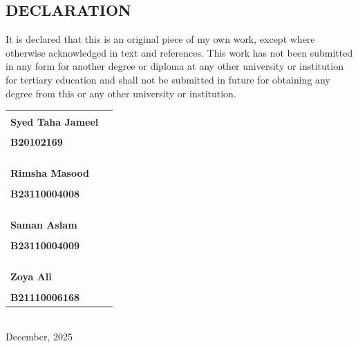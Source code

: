 \providecommand\phantomsection{} \phantomsection
\thispagestyle{plain}
\renewcommand{\baselinestretch}{1}\small\normalsize
\begin{center}
\section*{\centering\MakeUppercase{Declaration}}
\end{center}
\justify
It is declared that this is an original piece of my own work, except where otherwise acknowledged in text and references. This work has not been submitted in any form for another degree or diploma at any other university or institution for tertiary education and shall not be submitted in future for obtaining any degree from this or any other university or institution.
\bigskip
\newline
\newline
\newline
\begin{tabular}{ll}

\textbf{Syed Taha Jameel} & \rule{1.5in}{0.5pt} \\
\textbf{B20102169} & \\\\\\\\
\textbf{Rimsha Masood} & \rule{1.5in}{0.5pt} \\
\textbf{B23110004008} & \\\\\\\\
\textbf{Saman Aslam} & \rule{1.5in}{0.5pt} \\
\textbf{B23110004009} & \\\\\\\\
\textbf{Zoya Ali} & \rule{1.5in}{0.5pt} \\
\textbf{B21110006168} & \\

\end{tabular}
 \\
 \vfill
December, 2025
\newpage